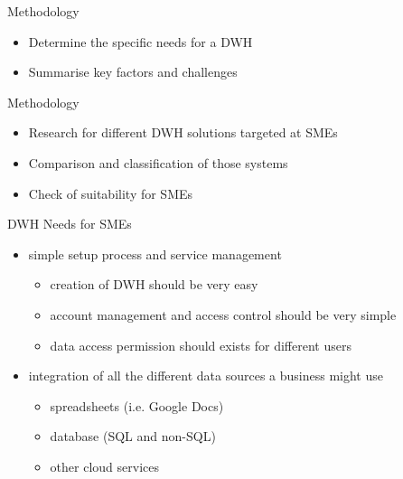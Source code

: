 \documentclass[aspectratio=169]{beamer}
\begin{document}
  \begin{frame}{Methodology}
    \begin{itemize}
      \item Determine the specific needs for a DWH
      \item Summarise key factors and challenges
    \end{itemize}
  \end{frame}

  \begin{frame}{Methodology}
    \begin{itemize}
      \item Research for different DWH solutions targeted at SMEs
      \item Comparison and classification of those systems
      \item Check of suitability for SMEs
    \end{itemize}
  \end{frame}

  \begin{frame}{DWH Needs for SMEs}
    \begin{itemize}
      \item simple setup process and service management
      \begin{itemize}
        \item creation of DWH should be very easy
        \item account management and access control should be very simple
        \item data access permission should exists for different users
      \end{itemize}
      \item integration of all the different data sources a business might use
      \begin{itemize}
        \item spreadsheets (i.e. Google Docs)
        \item database (SQL and non-SQL)
        \item other cloud services
      \end{itemize}
    \end{itemize}
  \end{frame}
\end{document}
